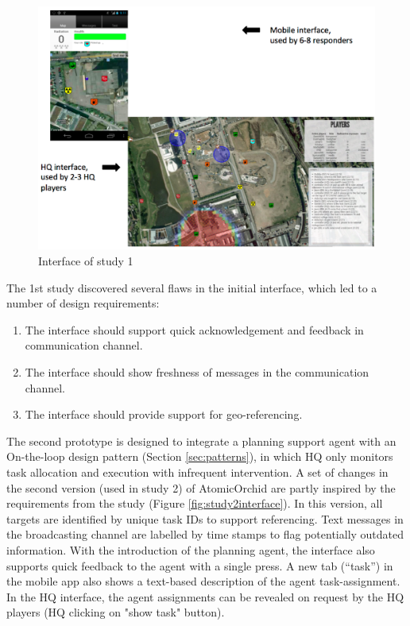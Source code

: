 \begin{figure}[H]
  \centering
  \includegraphics[width=1\textwidth]{img/conclusion/study1interface}
  \caption{Interface of study 1}
  \label{fig:study1interface}
\end{figure}



The 1st study discovered several flaws in the initial interface, which led to a number of design requirements: 

\begin{enumerate}
	 \item The interface should support quick acknowledgement and feedback in communication channel.
	 \item The interface should show freshness of messages in the communication channel.
	 \item The interface should provide support for geo-referencing.
\end{enumerate}

The second prototype is designed to integrate a planning support agent with an On-the-loop design pattern (Section \ref{sec:patterns}), in which HQ only monitors task allocation and execution with infrequent intervention. A set of changes in the second version (used in study 2) of AtomicOrchid are partly inspired by the requirements from the study (Figure \ref{fig:study2interface}). In this version, all targets are identified by unique task IDs to support referencing. Text messages in the broadcasting channel are labelled by time stamps to flag potentially outdated information. With the introduction of the planning agent, the interface also supports quick feedback to the agent with a single press. A new tab (``task'') in the mobile app also shows a text-based description of the agent task-assignment. In the HQ interface, the agent assignments can be revealed on request by the HQ players (HQ clicking on "show task" button).\\

